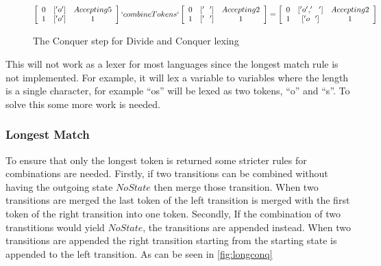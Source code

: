 \begin{figure}[!ht]
\begin{center}
$\left[\begin{array}{ccc}
0&['o']&Accepting 5\\
1&['o']&1\\
\end{array}\right] `combineTokens`
\left[\begin{array}{ccc}
0&['~~']&Accepting 2\\
1&['~~']&1\\
\end{array}\right] =
\left[\begin{array}{ccc}
0&['o','~~']&Accepting 2\\
1&['o~~']&1\\
\end{array}\right]$
\caption{The Conquer step for Divide and Conquer lexing\label{fig:conq}}
\end{center}
\end{figure}

This will not work as a lexer for most languages since the longest match rule is
not implemented. For example, it will lex a variable to variables where the
length is a single character, for example ``os'' will be lexed as two tokens,
``o'' and ``s''. To solve this some more work is needed.

\subsubsection{Longest Match}\label{longmatch}
To ensure that only the longest token is returned some stricter rules for
combinations are needed. Firstly, if two transitions can be combined without
having the outgoing state $NoState$ then merge those transition. When two
transitions are merged the last token of the left transition is merged with
the first token of the right transition into one token. Secondly, If the
combination of two transtitions would yield $NoState$, the transitions are
appended instead. When two transitions are appended the right transition
starting from the starting state is appended to the left transition. As can be
seen in \cref{fig:longconq} 

